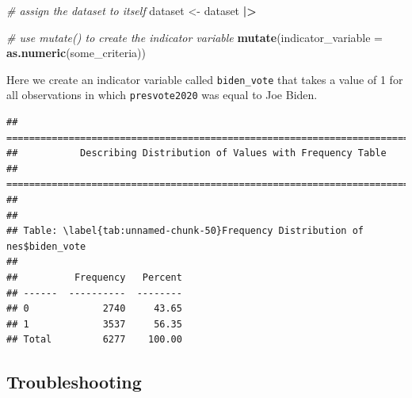 \documentclass[
]{book}
\newenvironment{Shaded}{\begin{snugshade}}{\end{snugshade}}
\newcommand{\AttributeTok}[1]{\textcolor[rgb]{0.13,0.29,0.53}{#1}}
\newcommand{\CommentTok}[1]{\textcolor[rgb]{0.56,0.35,0.01}{\textit{#1}}}
\newcommand{\FunctionTok}[1]{\textcolor[rgb]{0.13,0.29,0.53}{\textbf{#1}}}
\newcommand{\NormalTok}[1]{#1}
\newcommand{\OtherTok}[1]{\textcolor[rgb]{0.56,0.35,0.01}{#1}}
\newcommand{\SpecialCharTok}[1]{\textcolor[rgb]{0.81,0.36,0.00}{\textbf{#1}}}
\newcommand{\StringTok}[1]{\textcolor[rgb]{0.31,0.60,0.02}{#1}}
\begin{document}
\begin{Shaded}
\begin{Highlighting}[]
\CommentTok{\# assign the dataset to itself}
\NormalTok{dataset }\OtherTok{\textless{}{-}}\NormalTok{ dataset }\SpecialCharTok{|\textgreater{}}
  
  \CommentTok{\# use mutate() to create the indicator variable}
  \FunctionTok{mutate}\NormalTok{(}\AttributeTok{indicator\_variable =} \FunctionTok{as.numeric}\NormalTok{(some\_criteria))}
\end{Highlighting}
\end{Shaded}

Here we create an indicator variable called \texttt{biden\_vote} that takes a value of 1 for all observations in which \texttt{presvote2020} was equal to Joe Biden.

\begin{Shaded}
\end{Shaded}

\begin{verbatim}
## ===========================================================================
##           Describing Distribution of Values with Frequency Table
## ===========================================================================
## 
## 
## Table: \label{tab:unnamed-chunk-50}Frequency Distribution of nes$biden_vote
## 
##          Frequency   Percent
## ------  ----------  --------
## 0             2740     43.65
## 1             3537     56.35
## Total         6277    100.00
\end{verbatim}

\hypertarget{troubleshooting-17}{%
\subsection{Troubleshooting}\label{troubleshooting-17}}
\end{document}
